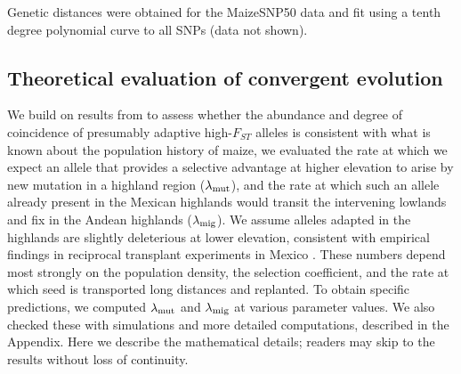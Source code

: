 Genetic distances were obtained for the MaizeSNP50 data \cite[]{Ganal_2011_22174790} and fit using a tenth degree polynomial curve to all SNPs (data not shown).
 
\subsection*{Theoretical evaluation of convergent evolution }
We build on results from \cite{ralph2014convergent} to assess whether the abundance and degree of coincidence of presumably adaptive high-$F_{ST}$ alleles is consistent with what is known about the population history of maize, we evaluated the rate at which we expect an allele that provides a selective advantage at higher elevation to arise by new mutation in a highland region ($\lambda_{\text{mut}}$), and the rate at which such an allele already present in the Mexican highlands would transit the intervening lowlands and fix in the Andean highlands ($\lambda_{\text{mig}}$).
We assume alleles adapted in the highlands are slightly deleterious at lower elevation, consistent with empirical findings in reciprocal transplant experiments in Mexico \cite[]{Mercer2008}.
These numbers depend most strongly on the population density, the selection coefficient, and the rate at which seed is transported long distances and replanted.
To obtain specific predictions, we computed $\lambda_{\text{mut}}$ and $\lambda_{\text{mig}}$ at various parameter values.
We also checked these with simulations and more detailed computations, described in the Appendix.
Here we describe the mathematical details; readers may skip to the results without loss of continuity.\\

